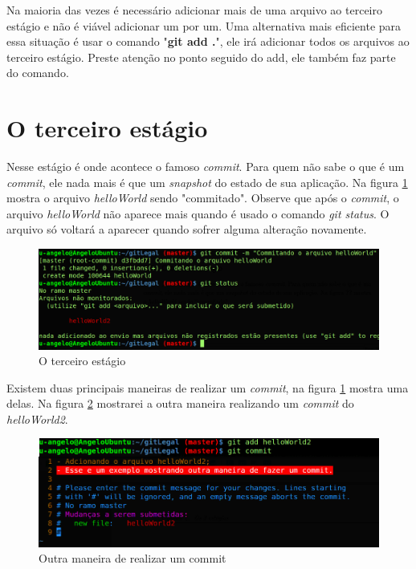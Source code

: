 \documentclass[12pt,openright,oneside,a4paper,english,brazil]{abntex2}
\begin{document}
Na maioria das vezes é necessário adicionar mais de uma arquivo ao terceiro estágio e não é viável adicionar um por um. Uma alternativa mais eficiente para essa situação é usar o comando "\textbf{git add .}", ele irá adicionar todos os arquivos ao terceiro estágio. Preste atenção no ponto seguido do add, ele também faz parte do comando.

\section{O terceiro estágio}

Nesse estágio é onde acontece o famoso \textit{commit}. Para quem não sabe o que é um \textit{commit}, ele nada mais é que um \textit{snapshot} do estado de sua aplicação. Na figura \ref{estagio3} mostra o arquivo \textit{helloWorld} sendo "commitado". Observe que após o \textit{commit}, o arquivo \textit{helloWorld} não aparece mais quando é usado o comando \textit{git status}. O arquivo só voltará a aparecer quando sofrer alguma alteração novamente. 

\begin{figure}[h]
	\caption{\label{estagio3}O terceiro estágio}
	\begin{center}
		\includegraphics[width=1\linewidth]{estagio3}
	\end{center}
\end{figure}

Existem duas principais maneiras de realizar um \textit{commit}, na figura \ref{estagio3} mostra uma delas. Na figura \ref{commit} mostrarei a outra maneira realizando um \textit{commit} do \textit{helloWorld2}. 

\begin{figure}[h]
	\caption{\label{commit}Outra maneira de realizar um commit}
	\begin{center}
		\includegraphics[width=1\linewidth]{commit2}
	\end{center}
\end{figure}
\end{document}
